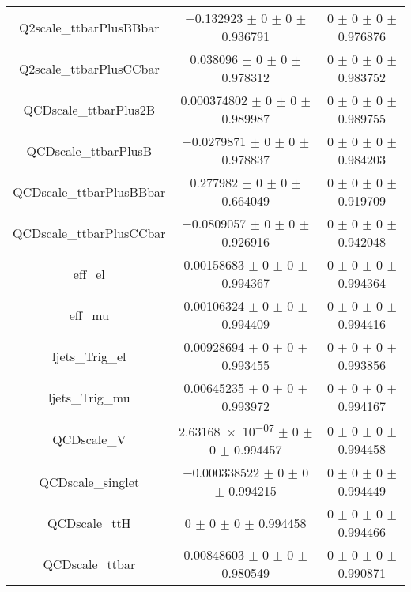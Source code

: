 \begin{table}
\begin{tabular}{ccc}
Q2scale\_ttbarPlusBBbar & \num{-0.132923} $\pm$ \num{0} $\pm$ \num{0} $\pm$ \num{0.936791} & \num{0} $\pm$ \num{0} $\pm$ \num{0} $\pm$ \num{0.976876}\\
Q2scale\_ttbarPlusCCbar & \num{0.038096} $\pm$ \num{0} $\pm$ \num{0} $\pm$ \num{0.978312} & \num{0} $\pm$ \num{0} $\pm$ \num{0} $\pm$ \num{0.983752}\\
QCDscale\_ttbarPlus2B & \num{0.000374802} $\pm$ \num{0} $\pm$ \num{0} $\pm$ \num{0.989987} & \num{0} $\pm$ \num{0} $\pm$ \num{0} $\pm$ \num{0.989755}\\
QCDscale\_ttbarPlusB & \num{-0.0279871} $\pm$ \num{0} $\pm$ \num{0} $\pm$ \num{0.978837} & \num{0} $\pm$ \num{0} $\pm$ \num{0} $\pm$ \num{0.984203}\\
QCDscale\_ttbarPlusBBbar & \num{0.277982} $\pm$ \num{0} $\pm$ \num{0} $\pm$ \num{0.664049} & \num{0} $\pm$ \num{0} $\pm$ \num{0} $\pm$ \num{0.919709}\\
QCDscale\_ttbarPlusCCbar & \num{-0.0809057} $\pm$ \num{0} $\pm$ \num{0} $\pm$ \num{0.926916} & \num{0} $\pm$ \num{0} $\pm$ \num{0} $\pm$ \num{0.942048}\\
eff\_el & \num{0.00158683} $\pm$ \num{0} $\pm$ \num{0} $\pm$ \num{0.994367} & \num{0} $\pm$ \num{0} $\pm$ \num{0} $\pm$ \num{0.994364}\\
eff\_mu & \num{0.00106324} $\pm$ \num{0} $\pm$ \num{0} $\pm$ \num{0.994409} & \num{0} $\pm$ \num{0} $\pm$ \num{0} $\pm$ \num{0.994416}\\
ljets\_Trig\_el & \num{0.00928694} $\pm$ \num{0} $\pm$ \num{0} $\pm$ \num{0.993455} & \num{0} $\pm$ \num{0} $\pm$ \num{0} $\pm$ \num{0.993856}\\
ljets\_Trig\_mu & \num{0.00645235} $\pm$ \num{0} $\pm$ \num{0} $\pm$ \num{0.993972} & \num{0} $\pm$ \num{0} $\pm$ \num{0} $\pm$ \num{0.994167}\\
QCDscale\_V & \num{2.63168e-07} $\pm$ \num{0} $\pm$ \num{0} $\pm$ \num{0.994457} & \num{0} $\pm$ \num{0} $\pm$ \num{0} $\pm$ \num{0.994458}\\
QCDscale\_singlet & \num{-0.000338522} $\pm$ \num{0} $\pm$ \num{0} $\pm$ \num{0.994215} & \num{0} $\pm$ \num{0} $\pm$ \num{0} $\pm$ \num{0.994449}\\
QCDscale\_ttH & \num{0} $\pm$ \num{0} $\pm$ \num{0} $\pm$ \num{0.994458} & \num{0} $\pm$ \num{0} $\pm$ \num{0} $\pm$ \num{0.994466}\\
QCDscale\_ttbar & \num{0.00848603} $\pm$ \num{0} $\pm$ \num{0} $\pm$ \num{0.980549} & \num{0} $\pm$ \num{0} $\pm$ \num{0} $\pm$ \num{0.990871}\\

\end{tabular}
\end{table}
